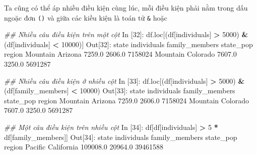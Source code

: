 \documentclass[
]{book}
\newenvironment{Shaded}{\begin{snugshade}}{\end{snugshade}}
\newcommand{\CommentTok}[1]{\textcolor[rgb]{0.56,0.35,0.01}{\textit{#1}}}
\newcommand{\DecValTok}[1]{\textcolor[rgb]{0.00,0.00,0.81}{#1}}
\newcommand{\FloatTok}[1]{\textcolor[rgb]{0.00,0.00,0.81}{#1}}
\newcommand{\NormalTok}[1]{#1}
\newcommand{\OperatorTok}[1]{\textcolor[rgb]{0.81,0.36,0.00}{\textbf{#1}}}
\newcommand{\StringTok}[1]{\textcolor[rgb]{0.31,0.60,0.02}{#1}}
\begin{document}
Ta cũng có thể áp nhiều điều kiện cùng lúc, mỗi điều kiện phải nằm trong dấu ngoặc đơn \texttt{()} và giữa các kiều kiện là toán tử \texttt{\&} hoặc \texttt{\textbar{}}

\begin{Shaded}
\begin{Highlighting}[]
\CommentTok{\#\# Nhiều câu điều kiện trên một cột}
\NormalTok{In [}\DecValTok{32}\NormalTok{]: df.loc[(df[}\StringTok{\textquotesingle{}individuals\textquotesingle{}}\NormalTok{] }\OperatorTok{\textgreater{}} \DecValTok{5000}\NormalTok{) }\OperatorTok{\&}\NormalTok{ (df[}\StringTok{\textquotesingle{}individuals\textquotesingle{}}\NormalTok{] }\OperatorTok{\textless{}} \DecValTok{10000}\NormalTok{)]}
\NormalTok{Out[}\DecValTok{32}\NormalTok{]:}
\NormalTok{             state  individuals  family\_members  state\_pop}
\NormalTok{region                                                    }
\NormalTok{Mountain   Arizona       }\FloatTok{7259.0}          \FloatTok{2606.0}    \DecValTok{7158024}
\NormalTok{Mountain  Colorado       }\FloatTok{7607.0}          \FloatTok{3250.0}    \DecValTok{5691287}

\CommentTok{\#\# Nhiều câu điều kiện ở nhiều cột}
\NormalTok{In [}\DecValTok{33}\NormalTok{]: df.loc[(df[}\StringTok{\textquotesingle{}individuals\textquotesingle{}}\NormalTok{] }\OperatorTok{\textgreater{}} \DecValTok{5000}\NormalTok{) }\OperatorTok{\&}\NormalTok{ (df[}\StringTok{\textquotesingle{}family\_members\textquotesingle{}}\NormalTok{] }\OperatorTok{\textless{}} \DecValTok{10000}\NormalTok{)}
\NormalTok{Out[}\DecValTok{33}\NormalTok{]:}
\NormalTok{             state  individuals  family\_members  state\_pop}
\NormalTok{region                                                    }
\NormalTok{Mountain   Arizona       }\FloatTok{7259.0}          \FloatTok{2606.0}    \DecValTok{7158024}
\NormalTok{Mountain  Colorado       }\FloatTok{7607.0}          \FloatTok{3250.0}    \DecValTok{5691287}

\CommentTok{\#\# Một câu điều kiện trên nhiều cột}
\NormalTok{In [}\DecValTok{34}\NormalTok{]: df[df[}\StringTok{\textquotesingle{}individuals\textquotesingle{}}\NormalTok{] }\OperatorTok{\textgreater{}} \DecValTok{5} \OperatorTok{*}\NormalTok{ df[}\StringTok{\textquotesingle{}family\_members\textquotesingle{}}\NormalTok{]]}
\NormalTok{Out[}\DecValTok{34}\NormalTok{]:}
\NormalTok{              state  individuals  family\_members  state\_pop}
\NormalTok{region                                                     }
\NormalTok{Pacific  California     }\FloatTok{109008.0}         \FloatTok{20964.0}   \DecValTok{39461588}
\end{Highlighting}
\end{Shaded}
\end{document}
